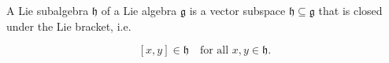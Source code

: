 A Lie subalgebra $\mathfrak{h}$ of a Lie algebra $\mathfrak{g}$ is a vector subspace $\mathfrak{h} \subseteq \mathfrak{g}$ that is closed under the Lie bracket, i.e.

$$[x, y] \in \mathfrak{h} \quad \text{for all } x, y \in \mathfrak{h}.$$
